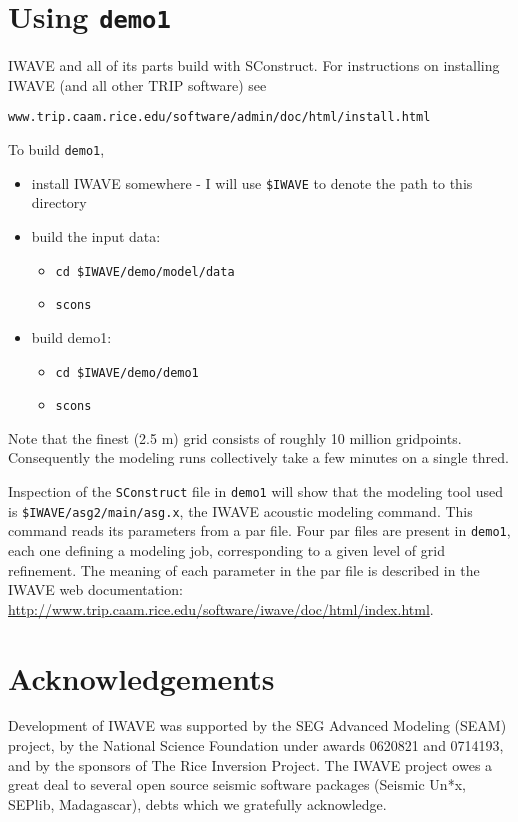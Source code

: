 \section{Using {\tt demo1}}
IWAVE and all of its parts build with SConstruct. For instructions on
installing IWAVE (and all other TRIP software) see 
\begin{verbatim}
www.trip.caam.rice.edu/software/admin/doc/html/install.html
\end{verbatim}

To build {\tt demo1},
\begin{itemize}
\item install IWAVE somewhere - I will use  {\tt \$IWAVE} to denote
  the path to this directory  
\item build the input data:
\begin{itemize} 
  \item {\tt cd \$IWAVE/demo/model/data}
\item {\tt scons}
\end{itemize}
\item build demo1:
\begin{itemize}
\item {\tt cd \$IWAVE/demo/demo1}
\item {\tt scons}
\end{itemize}
\end{itemize}
Note that the finest (2.5 m) grid consists of roughly 10 million
gridpoints. Consequently the modeling runs collectively take a few
minutes on a single thred.

Inspection of the {\tt SConstruct} file in {\tt demo1} will show that
the modeling tool used is {\tt \$IWAVE/asg2/main/asg.x}, the IWAVE
acoustic modeling command. This command reads its parameters from a
par file. Four par files are present in {\tt demo1}, each one defining
a modeling job, corresponding to a given level of grid refinement. The
meaning of each parameter in the par file is described in the IWAVE
web documentation: \url{http://www.trip.caam.rice.edu/software/iwave/doc/html/index.html}.

\section{Acknowledgements}
Development of IWAVE was supported by the SEG Advanced Modeling (SEAM) project, by the National Science Foundation under awards 0620821 and 0714193, and by the sponsors of The Rice Inversion Project. The IWAVE project owes a great deal to several open source seismic software packages (Seismic Un*x, SEPlib, Madagascar), debts which we gratefully acknowledge.
 
